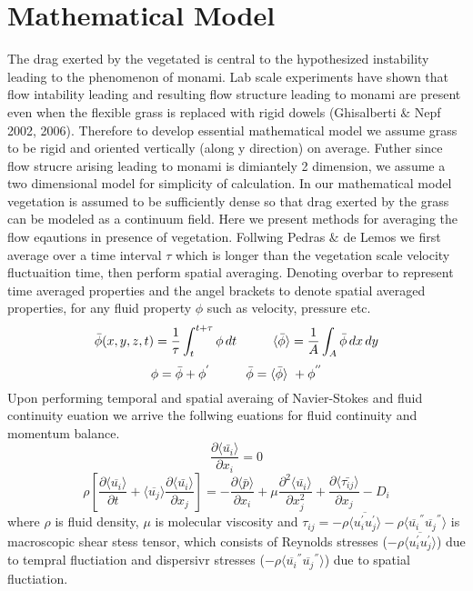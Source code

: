 \documentclass[12pt]{report}   %
\begin{document}
\chapter{Mathematical Model}
The drag exerted by the vegetated is central to the hypothesized instability leading to the phenomenon of monami. Lab scale experiments have shown that flow intability leading and resulting flow structure leading to monami are present even when the flexible grass is replaced with rigid dowels (Ghisalberti $\&$ Nepf 2002, 2006). Therefore to develop essential mathematical model we assume grass to be rigid and oriented vertically (along y direction) on average. Futher since flow strucre arising leading to monami is dimiantely 2 dimension, we assume a two dimensional model for simplicity of calculation. In our mathematical model vegetation is assumed to be sufficiently dense so that drag exerted by the grass can be modeled as a continuum field. Here we present methods for averaging the flow eqautions in presence of vegetation. Follwing Pedras $\&$ de Lemos we first average over a time interval $\tau$ which is longer than the vegetation scale velocity fluctuaition time, then perform spatial averaging. Denoting overbar to represent time averaged properties and the angel brackets to denote spatial averaged properties, for any fluid property $\phi$ such as velocity, pressure etc.
  \[ \bar{\phi}(x,y,z,t) = \frac{1}{\tau} \int_{t}^{t+\tau} \phi  \, dt \hspace{1.cm}  \langle \bar{\phi}\rangle = \frac{1}{A} \int_{A} \bar{\phi}  \,dx \,dy \]
  \[\phi = \bar{\phi}+\phi^{'} \hspace{1.cm}  \bar{\phi} = \langle \bar{\phi} \rangle \ +\phi^{''} \]
 Upon performing temporal and spatial averaing of Navier-Stokes and fluid continuity euation we arrive the follwing euations for fluid continuity and momentum balance.
 \[ \frac{\partial \langle \bar{u_i} \rangle}{\partial x_i}=0 \]
 \[\rho \left[ \frac{\partial \langle \overline{u_i} \rangle }{\partial t}+ \langle \overline{u_j} \rangle \frac{\partial \langle \bar{u_i} \rangle}{\partial x_j} \right ] = -\frac{\partial \langle \bar{p} \rangle  }{\partial x_i} + \mu \frac{\partial^2 \langle \bar{u_i} \rangle }{\partial         x_j^2} + \frac{\partial \langle \bar{\tau_{ij}} \rangle }{\partial x_j} -D_i\]
 where $\rho$ is fluid density, $\mu$ is molecular viscosity and 
 $\tau_{ij}=-\rho \langle \overline{u_i^{'} u_j^{'}} \rangle  -\rho \langle{ \overline{u_i}^{''} \overline{u_j}^{''} } \rangle  $ is macroscopic shear stess tensor, which consists of Reynolds stresses ($ -\rho \langle \overline {u_i^{'} u_j^{'}} \rangle $) due to tempral fluctiation and dispersivr stresses ($ -\rho \langle{ \overline{u_i}^{''} \overline{u_j}^{''} } \rangle $) due to spatial fluctiation. 
  
\end{document}
